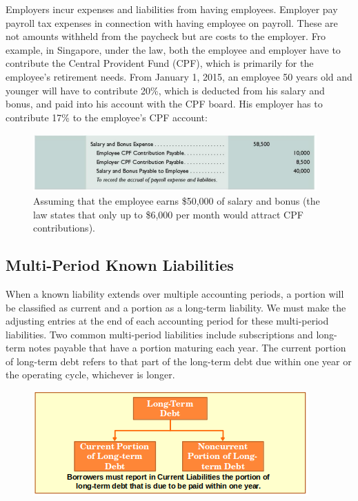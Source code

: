 \documentclass[../main.tex]{subfiles}
\begin{document}
	Employers incur expenses and liabilities from having employees. Employer 
	pay payroll tax expenses in connection with having employee on payroll. 
	These are not amounts withheld from the paycheck but are costs to the 
	employer. Fro example, in Singapore, under the law, both the employee and 
	employer have to contribute the Central Provident Fund (CPF), which is 
	primarily for the employee's retirement needs. From January 1, 2015, an 
	employee 50 years old and younger will have to contribute 20\%, which is 
	deducted from his salary and bonus, and paid into his account with the CPF 
	board.  His employer has to contribute 17\% to the employee's CPF account:
	
	\begin{figure}[ht!]
		\includegraphics[width=1\columnwidth]{images/c10_employee_payroll.png}
		\caption{Assuming that the employee earns \$50,000 of salary and bonus 
			(the law states that only up to \$6,000 per month would attract CPF 
			contributions).}
	\end{figure}
	
	\subsection{Multi-Period Known Liabilities}
	
	When a known liability extends over multiple accounting periods, a portion 
	will be classified as current and a portion as a long-term liability. We 
	must make the adjusting entries at the end of each accounting period for 
	these multi-period liabilities. Two common multi-period liabilities include 
	subscriptions and long-term notes payable that have a portion maturing each 
	year. The current portion of long-term debt refers to that part of the 
	long-term debt due within one year or the operating cycle, whichever is 
	longer. 
	
	\begin{figure}[ht!]
		\centering
		\includegraphics[width=0.9\columnwidth]{images/c10_long_term_liability.png}
	\end{figure}
	
\end{document}
